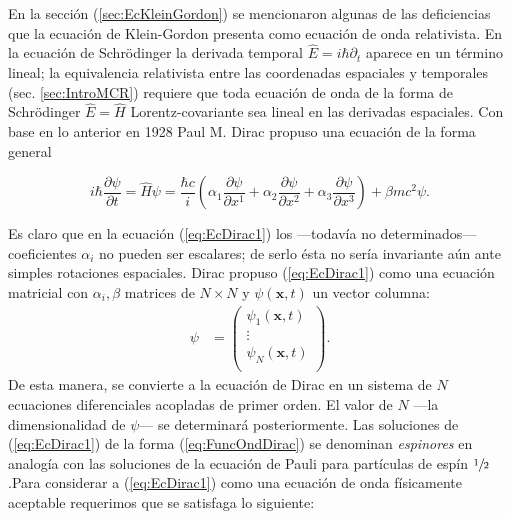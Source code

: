 En la sección (\ref{sec:EcKleinGordon}) se mencionaron algunas de las deficiencias que la ecuación de Klein-Gordon presenta como ecuación de onda relativista. En la ecuación de Schrödinger la derivada temporal $\hat{E}=i\hbar\partial_t$ aparece en un término lineal; la equivalencia relativista entre las coordenadas espaciales y temporales (sec. \ref{sec:IntroMCR}) requiere que toda ecuación de onda de la forma de Schrödinger $\hat{E}=\hat{H}$ Lorentz-covariante sea lineal en las derivadas espaciales. Con base en lo anterior en 1928 Paul M. Dirac propuso\cite{DiracQuantumTheoryElectron} una ecuación de la forma general

\begin{equation}\label{eq:EcDirac1}
i\hbar \frac{\partial \psi}{\partial t}= \hat{H}\psi =\frac{\hbar c}{i}\left( \alpha_1 \frac{\partial \psi}{\partial x^1} +\alpha_2\frac{\partial \psi}{\partial x^2} +\alpha_3 \frac{\partial \psi}{\partial x^3} \right)+ \beta m c^2 \psi.
\end{equation}

\noindent Es claro que en la ecuación (\ref{eq:EcDirac1}) los ---todavía no determinados--- coeficientes $\alpha_i$ no pueden ser escalares; de serlo ésta no sería invariante aún ante simples rotaciones espaciales. Dirac propuso (\ref{eq:EcDirac1}) como una ecuación matricial con $\alpha_i,\beta$ matrices de $N\times N$ y $\psi(\mathbf{x},t)$ un vector columna:
\begin{align}\label{eq:FuncOndDirac}
 \psi &=\left( \begin{matrix}
         \psi_1(\mathbf{x},t)\\
         \vdots\\
         \psi_N(\mathbf{x},t)\\
        \end{matrix}
        \right).
\end{align}
De esta manera, se convierte a la ecuación de Dirac en un sistema de $N$ ecuaciones diferenciales acopladas de primer orden. El valor de $N$ ---la dimensionalidad de $\psi$--- se determinará posteriormente. Las soluciones de (\ref{eq:EcDirac1}) de la forma (\ref{eq:FuncOndDirac}) se denominan \textit{espinores} en analogía con las soluciones de la ecuación de Pauli para partículas de espín $\sfrac{1}{2}$.\footnotemark Para considerar a (\ref{eq:EcDirac1}) como una ecuación de onda físicamente aceptable requerimos que se satisfaga lo siguiente:

